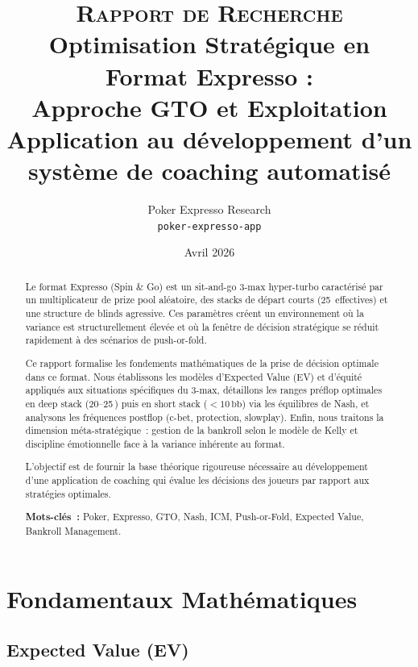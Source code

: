 \documentclass[a4paper,11pt]{article}
\title{
  \vspace{-1cm}
  {\Large\textsc{Rapport de Recherche}}\\[0.5cm]
  {\LARGE\textbf{Optimisation Strat\'egique en Format Expresso :\\
  Approche GTO et Exploitation}}\\[0.5cm]
  {\normalsize Application au d\'eveloppement d'un syst\`eme de coaching automatis\'e}
}
\author{
  Poker Expresso Research\\
  \small\texttt{poker-expresso-app}
}
\date{Avril 2026}
\newcommand{\bb}{\,\mathrm{bb}}
\begin{document}
\maketitle
\thispagestyle{empty}

\begin{abstract}
Le format Expresso (Spin \& Go) est un sit-and-go 3-max hyper-turbo caract\'eris\'e par un multiplicateur de prize pool al\'eatoire, des stacks de d\'epart courts (25\bb{} effectives) et une structure de blinds agressive. Ces param\`etres cr\'eent un environnement o\`u la variance est structurellement \'elev\'ee et o\`u la fen\^etre de d\'ecision strat\'egique se r\'eduit rapidement \`a des sc\'enarios de push-or-fold.

Ce rapport formalise les fondements math\'ematiques de la prise de d\'ecision optimale dans ce format. Nous \'etablissons les mod\`eles d'Expected Value (EV) et d'\'equit\'e appliqu\'es aux situations sp\'ecifiques du 3-max, d\'etaillons les ranges pr\'eflop optimales en deep stack (20--25\bb) puis en short stack ($<10\bb$) via les \'equilibres de Nash, et analysons les fr\'equences postflop (c-bet, protection, slowplay). Enfin, nous traitons la dimension m\'eta-strat\'egique~: gestion de la bankroll selon le mod\`ele de Kelly et discipline \'emotionnelle face \`a la variance inh\'erente au format.

L'objectif est de fournir la base th\'eorique rigoureuse n\'ecessaire au d\'eveloppement d'une application de coaching qui \'evalue les d\'ecisions des joueurs par rapport aux strat\'egies optimales.

\medskip
\noindent\textbf{Mots-cl\'es~:} Poker, Expresso, GTO, Nash, ICM, Push-or-Fold, Expected Value, Bankroll Management.
\end{abstract}

\tableofcontents
\newpage

\section{Fondamentaux Math\'ematiques}

\subsection{Expected Value (EV)}
\end{document}
